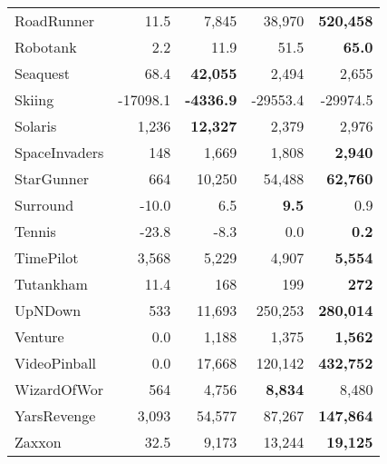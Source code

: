 \documentclass{article}
\begin{document}
\begin{table}[h]
\begin{tabular}{l r r r r}
RoadRunner           & 11.5       & 7,845      & 38,970     & \textbf{520,458} \\
Robotank             & 2.2        & 11.9       & 51.5       & \textbf{65.0} \\
Seaquest             & 68.4       & \textbf{42,055} & 2,494      & 2,655      \\
Skiing               & -17098.1   & \textbf{-4336.9} & -29553.4   & -29974.5   \\
Solaris              & 1,236      & \textbf{12,327} & 2,379      & 2,976      \\
SpaceInvaders        & 148        & 1,669      & 1,808      & \textbf{2,940} \\
StarGunner           & 664        & 10,250     & 54,488     & \textbf{62,760} \\
Surround             & -10.0      & 6.5        & \textbf{9.5} & 0.9        \\
Tennis               & -23.8      & -8.3       & 0.0        & \textbf{0.2} \\
TimePilot            & 3,568      & 5,229      & 4,907      & \textbf{5,554} \\
Tutankham            & 11.4       & 168        & 199        & \textbf{272} \\
UpNDown              & 533        & 11,693     & 250,253    & \textbf{280,014} \\
Venture              & 0.0        & 1,188      & 1,375      & \textbf{1,562} \\
VideoPinball         & 0.0        & 17,668     & 120,142    & \textbf{432,752} \\
WizardOfWor          & 564        & 4,756      & \textbf{8,834} & 8,480      \\
YarsRevenge          & 3,093      & 54,577     & 87,267     & \textbf{147,864} \\
Zaxxon               & 32.5       & 9,173      & 13,244     & \textbf{19,125} \\
\bottomrule
    \end{tabular}
\end{table}
\end{document}
